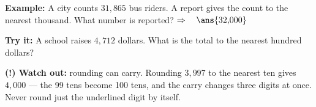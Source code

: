 \documentclass[12pt]{article}
\begin{document}
\begin{examplebox}
\textbf{Example:} \quad A city counts $31{,}865$ bus riders. A report gives the
count to the nearest thousand. What number is reported?
$\Rightarrow\quad \ans{32{,}000}$
\end{examplebox}

\begin{tryitbox}
\textbf{Try it:} \quad A school raises $4{,}712$ dollars. What is the total to
the nearest hundred dollars?\\[2pt]
\end{tryitbox}

\begin{watchoutbox}
\textbf{(!) Watch out:} rounding can carry. Rounding $3{,}997$ to the nearest
ten gives $4{,}000$ --- the 99 tens become 100 tens, and the carry changes
three digits at once. Never round just the underlined digit by itself.
\end{watchoutbox}
\end{document}

